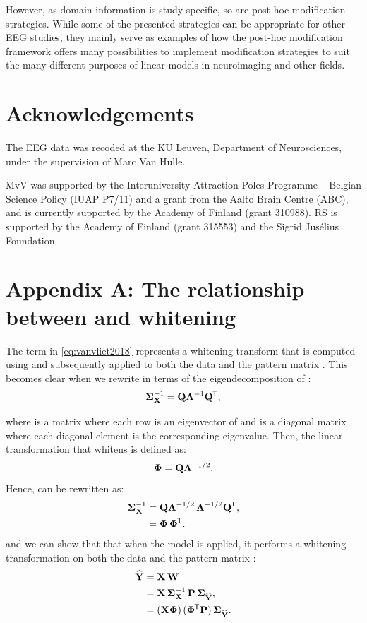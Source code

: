 \documentclass[a4paper]{vanvliet_paper}
\begin{document}
However, as domain information is study specific, so are post-hoc modification strategies.
While some of the presented strategies can be appropriate for other \gls{EEG} studies, they mainly serve as examples of how the post-hoc modification framework offers many possibilities to implement modification strategies to suit the many different purposes of linear models in neuroimaging and other fields.


\section{Acknowledgements}

The \gls{EEG} data was recoded at the KU Leuven, Department of Neurosciences, under the supervision of Marc Van Hulle.

MvV was supported by the Interuniversity Attraction Poles Programme -- Belgian Science Policy (IUAP P7/11) and a grant from the Aalto Brain Centre (ABC), and is currently supported by the Academy of Finland (grant 310988). RS is supported by the Academy of Finland (grant 315553) and the Sigrid Jus\'{e}lius Foundation.

\section*{Appendix A: The relationship between  and whitening}

The  term in \autoref{eq:vanvliet2018} represents a whitening transform that is computed using  and subsequently applied to both the data  and the pattern matrix .
This becomes clear when we rewrite  in terms of the eigendecomposition of :
\begin{align}
    \mathbf{\Sigma}^{-1}_{\mathbf{X}} = \mathbf{Q}\mathbf{\Lambda}^{-1}\mathbf{Q}^{\mkern-1.5mu\mathsf{T}},
\end{align}

where  is a matrix where each row is an eigenvector of  and \tmat{\Lambda} is a diagonal matrix where each diagonal element is the corresponding eigenvalue.
Then, the linear transformation \tmat{\Phi} that whitens  is defined as:
\begin{align}
    \mathbf{\Phi} = \mathbf{Q}\mathbf{\Lambda}^{-1/2}.
\end{align}
Hence,  can be rewritten as:
\begin{align}
    \mathbf{\Sigma}^{-1}_{\mathbf{X}} &= \mathbf{Q}\mathbf{\Lambda}^{-1/2} \, \mathbf{\Lambda}^{-1/2}\mathbf{Q}^{\mkern-1.5mu\mathsf{T}},\\
             &= \mathbf{\Phi} \, \mathbf{\Phi}^{\mkern-1.5mu\mathsf{T}}.
\end{align}
and we can show that that when the model is applied, it performs a whitening transformation on both the data  and the pattern matrix :
\begin{align}
    \widehat{\mathbf{Y}} &= \mathbf{X} \, \mathbf{W} \\
             &= \mathbf{X} \, \mathbf{\Sigma}^{-1}_{\mathbf{X}} \, \mathbf{P} \, \mathbf{\Sigma}_{\mathbf{\widehat{\mathbf{Y}}}}, \\
             &= (\mathbf{X} \mathbf{\Phi}) \, (\mathbf{\Phi}^{\mkern-1.5mu\mathsf{T}} \mathbf{P}) \, \mathbf{\Sigma}_{\mathbf{\widehat{\mathbf{Y}}}}.
\end{align}
\end{document}

